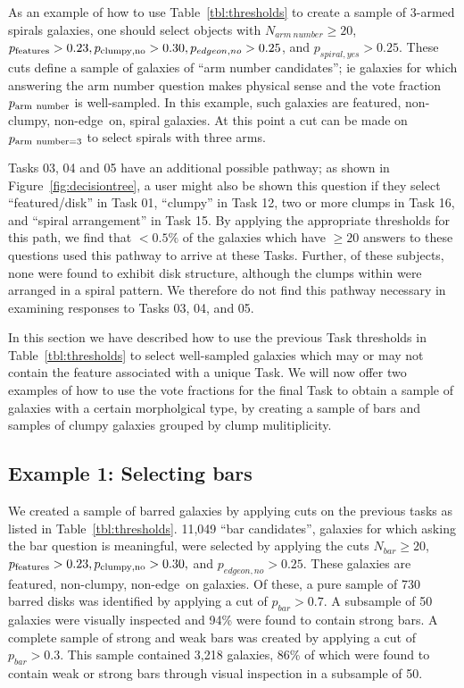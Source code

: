 \documentclass[twocolumn]{aastex6}
\begin{document}
As an example of how to use Table~\ref{tbl:thresholds} to create a sample of 3-armed spirals galaxies, one should select objects with $N_{arm~number} \ge 20$, $p_{\rm features}>0.23, p_{\rm clumpy,no} > 0.30, p_{edgeon,no}>0.25$, and $p_{spiral,yes}>0.25$. These cuts define a sample of galaxies of ``arm number candidates''; ie galaxies for which answering the arm number question makes physical sense and the vote fraction $p_{\rm arm~number}$ is well-sampled. In this example, such galaxies are featured, non-clumpy, non-edge~on, spiral galaxies. At this point a cut can be made on $p_{\rm arm~number=3}$ to select spirals with three arms. 

Tasks 03, 04 and 05 have an additional possible pathway; as shown in Figure~\ref{fig:decisiontree}, a user might also be shown this question if they select ``featured/disk'' in Task 01, ``clumpy'' in Task 12, two or more clumps in Task 16, and ``spiral arrangement'' in Task 15. By applying the appropriate thresholds for this path, we find that $< 0.5\%$ of the galaxies which have $\ge 20$ answers to these questions used this pathway to arrive at these Tasks. Further, of these subjects, none were found to exhibit disk structure, although the clumps within were arranged in a spiral pattern. We therefore do not find this pathway necessary in examining responses to Tasks 03, 04, and 05.

In this section we have described how to use the previous Task thresholds in Table~\ref{tbl:thresholds} to select well-sampled galaxies which may or may not contain the feature associated with a unique Task. We will now offer two examples of how to use the vote fractions for the final Task to obtain a sample of galaxies with a certain morpholgical type, by creating a sample of bars and samples of clumpy galaxies grouped by clump mulitiplicity. 

\subsection{Example 1: Selecting bars} 

We created a sample of barred galaxies by applying cuts on the previous tasks as listed in Table~\ref{tbl:thresholds}. 11,049 ``bar candidates'', galaxies for which asking the bar question is meaningful, were selected by applying the cuts $N_{bar} \ge 20$, $p_{\rm features}>0.23, p_{\rm clumpy,no} > 0.30,$ and $p_{edgeon,no}>0.25$. These galaxies are featured, non-clumpy, non-edge~on galaxies. Of these, a pure sample of 730 barred disks was identified by applying a cut of $p_{bar}>0.7$. A subsample of 50 galaxies were visually inspected and 94\% were found to contain strong bars. A complete sample of strong and weak bars was created by applying a cut of $p_{bar}>0.3$. This sample contained 3,218 galaxies, 86\% of which were found to contain weak or strong bars through visual inspection in a subsample of 50.
\end{document}
